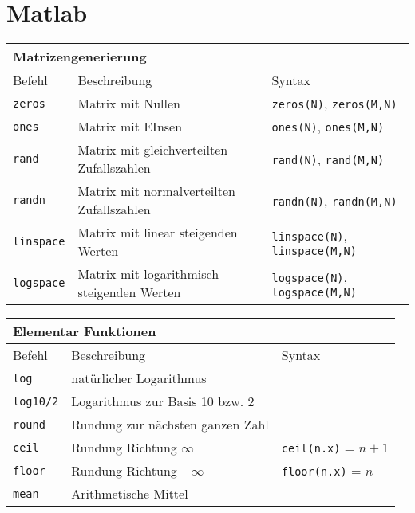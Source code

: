 



\chapter{Matlab}

\begin{tabular}{lp{5cm}p{2.2cm}} 
\multicolumn{3}{l}{\textbf{Matrizengenerierung}} \\\toprule
Befehl & Beschreibung & Syntax \\ \midrule
\verb|zeros| & Matrix mit Nullen & \verb|zeros(N)|, \verb|zeros(M,N)| \\ 
\verb|ones| & Matrix mit EInsen & \verb|ones(N)|, \verb|ones(M,N)| \\ 
\verb|rand| & Matrix mit gleichverteilten Zufallszahlen & \verb|rand(N)|, \verb|rand(M,N)| \\ 
\verb|randn| & Matrix mit normalverteilten Zufallszahlen & \verb|randn(N)|, \verb|randn(M,N)| \\ 
\verb|linspace| & Matrix mit linear steigenden Werten & \verb|linspace(N)|, \verb|linspace(M,N)| \\ 
\verb|logspace| & Matrix mit logarithmisch steigenden Werten & \verb|logspace(N)|, \verb|logspace(M,N)| \\ \bottomrule
\end{tabular} 

\begin{tabular}{lp{5cm}p{2.2cm}} 
\multicolumn{3}{l}{\textbf{Elementar Funktionen}} \\\toprule
Befehl & Beschreibung & Syntax \\ \midrule
\verb|log| & natürlicher Logarithmus & \\ 
\verb|log10/2| & Logarithmus zur Basis 10 bzw. 2 & \\ 
\verb|round| & Rundung zur nächsten ganzen Zahl &  \\ 
\verb|ceil| & Rundung Richtung $\infty$ & \verb|ceil(n.x)| = $n+1$ \\ 
\verb|floor| & Rundung Richtung $-\infty$ & \verb|floor(n.x)| = $n$ \\ 
\verb|mean| & Arithmetische Mittel & \\ \bottomrule
\end{tabular}

